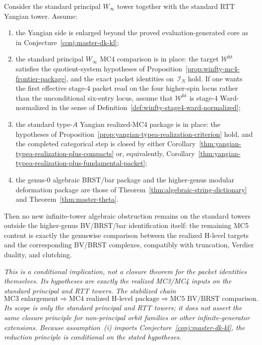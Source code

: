 \begin{conjecture}
\label{conj:standard-tower-mc5-reduction}
Consider the standard principal
\texorpdfstring{$W_\infty$}{W_infty} tower together with the standard RTT
Yangian tower. Assume:
\begin{enumerate}[label=\textup{(\roman*)}]
\item the Yangian side is enlarged beyond the proved
 evaluation-generated core as in
 Conjecture~\ref{conj:master-dk-kl};
\item the standard principal \texorpdfstring{$W_\infty$}{W_infty}
 MC4 comparison is in place: the target $\mathcal{W}^{\mathrm{ht}}$
 satisfies the quotient-system hypotheses of
 Proposition~\ref{prop:winfty-mc4-frontier-package}, and the exact
 packet identities on~$\mathcal{I}_N$ hold. If one wants the first
 effective stage-$4$ packet read on the four higher-spin locus rather than
 the unconditional six-entry locus, assume that
 $\mathcal{W}^{\mathrm{ht}}$ is stage-$4$ Ward-normalized in the
 sense of Definition~\ref{def:winfty-stage4-ward-normalized};
\item the standard type-$A$ Yangian realized-MC4 package is in place:
 the hypotheses of
 Proposition~\ref{prop:yangian-typea-realization-criterion} hold, and
 the completed categorical step is closed by either
 Corollary~\ref{thm:yangian-typea-realization-plus-compacts} or,
 equivalently,
 Corollary~\ref{thm:yangian-typea-realization-plus-fundamental-packet};
\item the genus-$0$ algebraic BRST/bar package and the higher-genus
 modular deformation package are those of
 Theorem~\ref{thm:algebraic-string-dictionary} and
 Theorem~\ref{thm:master-theta}.
\end{enumerate}
Then no new infinite-tower algebraic obstruction remains on the
standard towers outside the higher-genus BV/BRST/bar identification
itself: the remaining MC5 content is exactly the genuswise comparison
between the realized H-level targets and the corresponding BV/BRST
complexes, compatibly with truncation, Verdier duality, and clutching.

\emph{This is a conditional implication, not a closure theorem for the
packet identities themselves. Its hypotheses are exactly the realized
MC3/MC4 inputs on the standard principal and RTT towers. The
stabilized chain
\[
\text{MC3 enlargement}
\Longrightarrow
\text{MC4 realized H-level package}
\Longrightarrow
\text{MC5 BV/BRST comparison}.
\]
Its scope is only the standard principal and RTT towers; it does not
assert the same closure principle for non-principal orbit families or
other infinite-generator extensions. Because
assumption~\textup{(i)} imports
Conjecture~\ref{conj:master-dk-kl}, the reduction principle is
conditional on the stated hypotheses.}
\end{conjecture}

